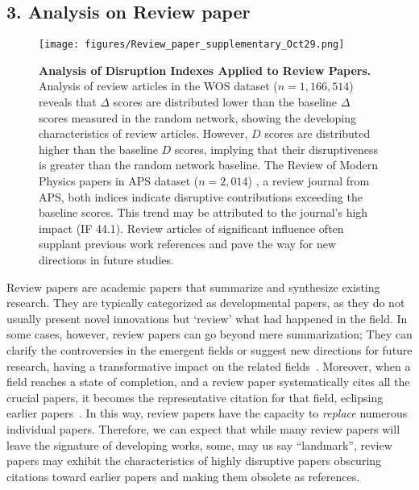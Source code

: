 \documentclass[12pt]{article}
\begin{document}
\begin{refsection}
\subsection*{3. Analysis on Review paper}
\label{supplementary:subsection_review}
\begin{figure}[htbp]
    \centering
    \texttt{[image: figures/Review\_paper\_supplementary\_Oct29.png]}
    \caption{  
    \textbf{Analysis of Disruption Indexes Applied to Review Papers.} Analysis of review articles in the WOS dataset ($n=1,166,514$) reveals that $\Delta$ scores are distributed lower than the baseline $\Delta$ scores measured in the random network, showing the developing characteristics of review articles. However, $D$ scores are distributed higher than the baseline $D$ scores, implying that their disruptiveness is greater than the random network baseline. The Review of Modern Physics papers in APS dataset ($n=2,014$) , a review journal from APS, both indices indicate disruptive contributions exceeding the baseline scores. This trend may be attributed to the journal's high impact (IF 44.1). Review articles of significant influence often supplant previous work references and pave the way for new directions in future studies. }
\label{fig:sup_distribution_disruption_review}
\end{figure}


Review papers are academic papers that summarize and synthesize existing research. They are typically categorized as developmental papers, as they do not usually present novel innovations but `review' what had happened in the field. In some cases, however, review papers can go beyond mere summarization; They can clarify the controversies in the emergent fields or suggest new directions for future research, having a transformative impact on the related fields~\cite{palmatier2018review,paul2021writing}. Moreover, when a field reaches a state of completion, and a review paper systematically cites all the crucial papers, it becomes the representative citation for that field, eclipsing earlier papers~\cite{mcmahan2021creative}. In this way, review papers have the capacity to \emph{replace} numerous individual papers. Therefore, we can expect that while many review papers will leave the signature of developing works, some, may us say ``landmark'', review papers may exhibit the characteristics of highly disruptive papers obscuring citations toward earlier papers and making them obsolete as references. 



\end{refsection}
\end{document}
